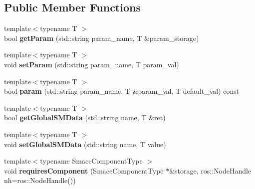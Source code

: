 \subsection*{Public Member Functions}
\begin{DoxyCompactItemize}
\item 
\hypertarget{classsmacc_1_1SmaccState_aa5f455c4336d18ce25a4e0f42a5b122b}{{\footnotesize template$<$typename T $>$ }\\bool {\bfseries get\-Param} (std\-::string param\-\_\-name, T \&param\-\_\-storage)}\label{classsmacc_1_1SmaccState_aa5f455c4336d18ce25a4e0f42a5b122b}

\item 
\hypertarget{classsmacc_1_1SmaccState_ab554e83f5d07ce4efe53d8bcaeb0693a}{{\footnotesize template$<$typename T $>$ }\\void {\bfseries set\-Param} (std\-::string param\-\_\-name, T param\-\_\-val)}\label{classsmacc_1_1SmaccState_ab554e83f5d07ce4efe53d8bcaeb0693a}

\item 
\hypertarget{classsmacc_1_1SmaccState_a95440a92a44e89ca564356835be79fe5}{{\footnotesize template$<$typename T $>$ }\\bool {\bfseries param} (std\-::string param\-\_\-name, T \&param\-\_\-val, T default\-\_\-val) const }\label{classsmacc_1_1SmaccState_a95440a92a44e89ca564356835be79fe5}

\item 
\hypertarget{classsmacc_1_1SmaccState_ad53b5be2760eb7ffb50f3b2e542b65f1}{{\footnotesize template$<$typename T $>$ }\\bool {\bfseries get\-Global\-S\-M\-Data} (std\-::string name, T \&ret)}\label{classsmacc_1_1SmaccState_ad53b5be2760eb7ffb50f3b2e542b65f1}

\item 
\hypertarget{classsmacc_1_1SmaccState_a98f2673b257479e0a3615d5d8279a591}{{\footnotesize template$<$typename T $>$ }\\void {\bfseries set\-Global\-S\-M\-Data} (std\-::string name, T value)}\label{classsmacc_1_1SmaccState_a98f2673b257479e0a3615d5d8279a591}

\item 
\hypertarget{classsmacc_1_1SmaccState_a880a01f691136de365749c2e035d5127}{{\footnotesize template$<$typename Smacc\-Component\-Type $>$ }\\void {\bfseries requires\-Component} (Smacc\-Component\-Type $\ast$\&storage, ros\-::\-Node\-Handle nh=ros\-::\-Node\-Handle())}\label{classsmacc_1_1SmaccState_a880a01f691136de365749c2e035d5127}


\end{DoxyCompactItemize}
